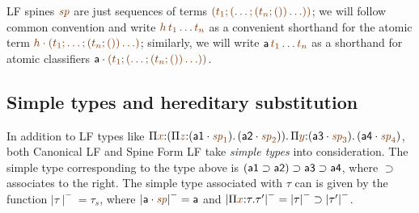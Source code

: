 LF spines $\lf\spi$ are just sequences of terms $\lf{(t_1; (\ldots;
  (t_n;())\ldots))}$; we will follow common convention and write
$\lf{h\,t_1\ldots t_n}$ as a convenient shorthand for the atomic term
$\lf{\lfroot{h}{(t_1; \ldots; (t_n;())\ldots)}}$; similarly, we will
write ${\sf a}\,\lf{t_1\ldots t_n}$ as a shorthand for atomic
classifiers $\lfroot{\sf a}{(t_1;
  (\ldots; (t_n;())\ldots))}$. %

\subsection{Simple types and hereditary substitution}

In addition to LF types like $\lfpi{x}{(\lfpi{z}{(\lfroot{\sf
      a1}{\spi_1})}{\,(\lfroot{\sf
      a2}{\spi_2})})}{\,\lfpi{y}{(\lfroot{\sf
      a3}{\spi_3})}{\,(\lfroot{\sf a4}{\spi_4})}}$, both Canonical LF
and Spine Form LF take {\it simple types} into consideration. The
simple type corresponding to the type above is $({\sf a1} \supset {\sf
  a2}) \supset {\sf a3} \supset {\sf a4}$, where ${\supset}$
associates to the right. The simple type associated with
$\tau$ can is given by the function ${\mid}\tau{\mid}^- = \tau_s$, where
${\mid}\lfroot{\sf a}{\spi}{\mid}^- = {\sf a}$ and
${\mid}\lfpi{x}{\tau}{\tau'}{\mid}^- = {\mid}\tau{\mid}^- \supset
{\mid}\tau'{\mid}^-$. 


